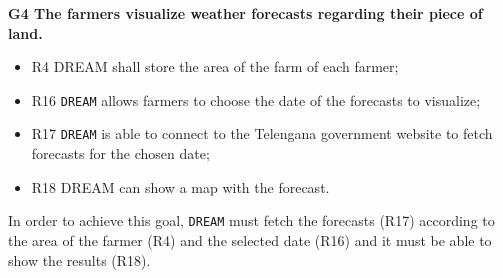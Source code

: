 \documentclass{article}
\begin{document}
\vspace{5mm}
\textbf{G4 The farmers visualize weather forecasts regarding their piece of land.}
\begin{itemize}
    \item R4 DREAM shall store the area of the farm of each farmer;

    \item R16 \verb|DREAM| allows farmers to choose the date of the forecasts to visualize;

    \item R17 \verb|DREAM| is able to connect to the Telengana government website to fetch forecasts for the chosen date;

    \item R18 DREAM can show a map with the forecast.
\end{itemize}
In order to achieve this goal, \verb|DREAM| must fetch the forecasts (R17) according to the area of the farmer (R4) and the selected date (R16) and it must be able to show the results (R18).
\end{document}
